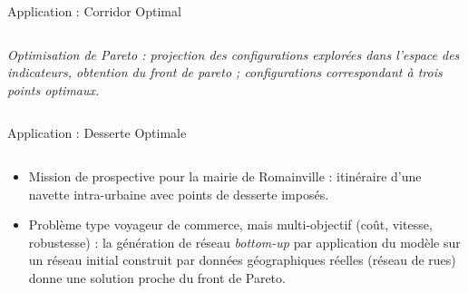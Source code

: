 \documentclass{beamer}
\begin{document}
\begin{frame}{}
\begin{columns}[t]
\begin{column}{.49\textwidth}
\begin{block}{Application : Corridor Optimal}
\begin{columns}[t]
\begin{column}{.95\textwidth}
\begin{justify}
          \textit{Optimisation de Pareto : projection des configurations explorées dans l'espace des indicateurs, obtention du front de pareto ; configurations correspondant à trois points optimaux.}
         
          
          \end{justify}
          \end{column}
          \end{columns}
        \end{block}

        \begin{block}{Application : Desserte Optimale}
        \vspace{-1.5cm}
          \begin{columns}[t]
        \begin{column}{.95\textwidth}
        \begin{itemize}
          \item \begin{justify}Mission de prospective pour la mairie de Romainville : itinéraire d'une navette intra-urbaine avec points de desserte imposés.\end{justify}
          \bigskip
          \item \begin{justify} Problème type voyageur de commerce, mais multi-objectif (coût, vitesse, robustesse) : la génération de réseau \emph{bottom-up} par application du modèle sur un réseau initial construit par données géographiques réelles (réseau de rues) donne une solution proche du front de Pareto.\end{justify}
          \end{itemize}
          \vspace{2cm}
          

\end{column}
\end{columns}
\end{block}
\end{column}
\end{columns}
\end{frame}
\end{document}
